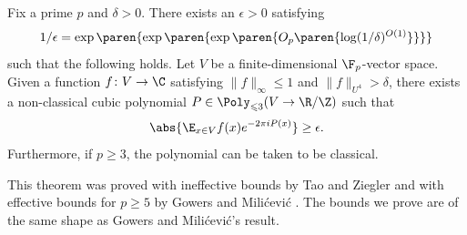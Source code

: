 \begin{thm}
\label{thm:inverse}
Fix a prime $p$ and $\delta>0$. There exists an $\epsilon>0$ satisfying \[1/\epsilon=\exp\paren{\exp\paren{\exp\paren{O_p\paren{\log(1/\delta)^{O(1)}}}}}\]
such that the following holds. Let $V$ be a finite-dimensional $\F_p$-vector space. Given a function $f\colon V\to\C$ satisfying $\|f\|_\infty\leq1$ and $\|f\|_{U^{4}}>\delta$, there exists a non-classical cubic polynomial $P\in\Poly_{\leqslant 3}(V\to\R/\Z)$ such that \[\abs{\E_{x\in V} f(x)e^{-2\pi i P(x)}}\geq \epsilon.\]
Furthermore, if $p\geq 3$, the polynomial can be taken to be classical.
\end{thm}

This theorem was proved with ineffective bounds by Tao and Ziegler \cite[Theorem 1.10]{TZ12} and with effective bounds for $p\geq 5$ by Gowers and Mili\'cevi\'c \cite[Theorem 7]{GM20}. The bounds we prove are of the same shape as Gowers and Mili\'cevi\'c's result.
